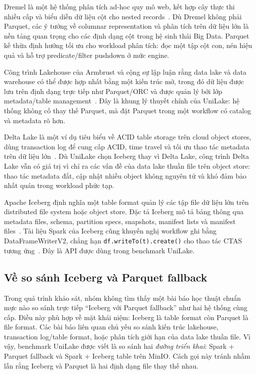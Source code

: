 Dremel là một hệ thống phân tích ad-hoc quy mô web, kết hợp cây thực thi nhiều cấp và biểu diễn dữ liệu cột cho nested records~\cite{dremelPaper}. Dù Dremel không phải Parquet, các ý tưởng về columnar representation và phân tích trên dữ liệu lớn là nền tảng quan trọng cho các định dạng cột trong hệ sinh thái Big Data. Parquet kế thừa định hướng tối ưu cho workload phân tích: đọc một tập cột con, nén hiệu quả và hỗ trợ predicate/filter pushdown ở mức engine.

Công trình Lakehouse của Armbrust và cộng sự lập luận rằng data lake và data warehouse có thể được hợp nhất bằng một kiến trúc mở, trong đó dữ liệu được lưu trên định dạng trực tiếp như Parquet/ORC và được quản lý bởi lớp metadata/table management~\cite{lakehousePaper}. Đây là khung lý thuyết chính của UniLake: hệ thống không cố thay thế Parquet, mà đặt Parquet trong một workflow có catalog và metadata rõ hơn.

Delta Lake là một ví dụ tiêu biểu về ACID table storage trên cloud object stores, dùng transaction log để cung cấp ACID, time travel và tối ưu thao tác metadata trên dữ liệu lớn~\cite{deltaLakePaper}. Dù UniLake chọn Iceberg thay vì Delta Lake, công trình Delta Lake vẫn có giá trị vì chỉ ra các vấn đề của data lake thuần file trên object store: thao tác metadata đắt, cập nhật nhiều object không nguyên tử và khó đảm bảo nhất quán trong workload phức tạp.

Apache Iceberg định nghĩa một table format quản lý các tập file dữ liệu lớn trên distributed file system hoặc object store. Đặc tả Iceberg mô tả bảng thông qua metadata files, schema, partition specs, snapshots, manifest lists và manifest files~\cite{icebergSpec}. Tài liệu Spark của Iceberg cũng khuyến nghị workflow ghi bằng DataFrameWriterV2, chẳng hạn \texttt{df.writeTo(t).create()} cho thao tác CTAS tương ứng~\cite{icebergSparkWrites}. Đây là API được dùng trong benchmark UniLake.

\subsection{Về so sánh Iceberg và Parquet fallback}

Trong quá trình khảo sát, nhóm không tìm thấy một bài báo học thuật chuẩn mực nào so sánh trực tiếp ``Iceberg với Parquet fallback'' như hai hệ thống cùng cấp. Điều này phù hợp về mặt khái niệm: Iceberg là table format còn Parquet là file format. Các bài báo liên quan chủ yếu so sánh kiến trúc lakehouse, transaction log/table format, hoặc phân tích giới hạn của data lake thuần file. Vì vậy, benchmark UniLake được viết là so sánh hai \textit{đường triển khai}: Spark + Parquet fallback và Spark + Iceberg table trên MinIO. Cách gọi này tránh nhầm lẫn rằng Iceberg và Parquet là hai định dạng file thay thế nhau.

